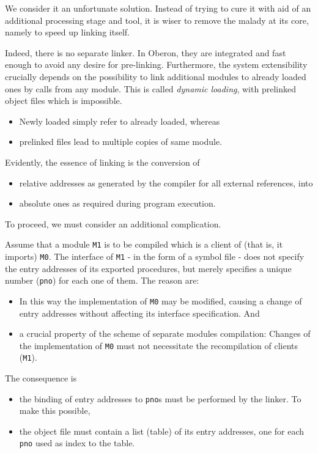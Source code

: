 We consider it an unfortunate solution.  Instead of trying to
cure it with aid of an additional processing stage and tool,
it is wiser to remove the malady at its core, namely to speed up linking itself.

Indeed, there is no separate linker.  In Oberon,
they are integrated and fast enough to avoid any desire for pre-linking.
Furthermore, the system extensibility crucially depends on the possibility
to link additional modules to already loaded ones by calls from any module.
This is called \emph{dynamic loading}, with prelinked object files which is impossible.
\begin{itemize}
  \item Newly loaded simply refer to already loaded, whereas
  \item prelinked files lead to multiple copies of same module.
\end{itemize}

Evidently, the essence of linking is the conversion of
\begin{itemize}
  \item relative addresses as generated by the compiler for all external references, into
  \item absolute ones as required during program execution.
\end{itemize}
To proceed, we must consider an additional complication.

Assume that a module \verb|M1| is to be compiled
which is a client of (that is, it imports) \verb|M0|.
The interface of \verb|M1| - in the form of a symbol file - does not specify the entry addresses
of its exported procedures, but merely specifies a unique number (\verb|pno|) for each one of them.
The reason are:
\begin{itemize}
  \item In this way the implementation of \verb|M0| may be modified,
    causing a change of entry addresses without affecting its interface specification.  And
  \item a crucial property of the scheme of separate modules compilation:
    Changes of the implementation of \verb|M0| must not necessitate
    the recompilation of clients (\verb|M1|).
\end{itemize}
The consequence is
\begin{itemize}
  \item the binding of entry addresses to \verb|pno|s must be performed by the linker.
    To make this possible,
  \item the object file must contain a list (table) of its entry addresses,
    one for each \verb|pno| used as index to the table.
\end{itemize}

